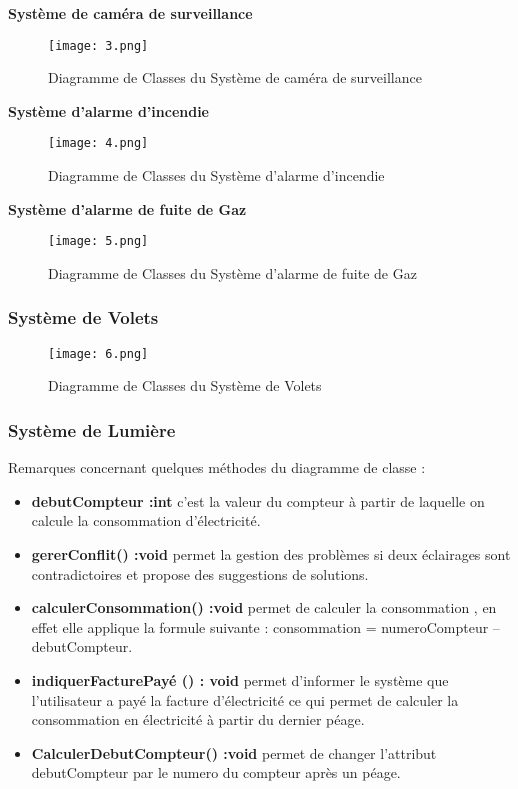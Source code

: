 \begin{spacing}{1.2}
\textbf{Système de caméra de surveillance}

\begin{figure}[H]\centering
\texttt{[image: 3.png]}
\caption{Diagramme de Classes du Système de caméra de surveillance}
\label{fig:fig3}
\end{figure}

\textbf{Système d’alarme d’incendie}

\begin{figure}[H]\centering
\texttt{[image: 4.png]}
\caption{Diagramme de Classes du Système d’alarme d’incendie}
\label{fig:fig3}
\end{figure}

\textbf{Système d’alarme de fuite de Gaz}

\begin{figure}[H]\centering
\texttt{[image: 5.png]}
\caption{Diagramme de Classes du Système d’alarme de fuite de Gaz}
\label{fig:fig3}
\end{figure}

\subsubsection{Système de Volets}
\begin{figure}[H]\centering
\texttt{[image: 6.png]}
\caption{Diagramme de Classes du Système de Volets}
\label{fig:fig3}
\end{figure}

\subsubsection{Système de Lumière}
Remarques concernant quelques méthodes du diagramme de classe :
\begin{itemize}
    \item \textbf{debutCompteur :int} c’est la valeur du compteur à partir de laquelle on calcule la consommation d’électricité. 
    \item \textbf{gererConflit() :void} permet la gestion des problèmes si deux éclairages sont contradictoires et propose des suggestions de solutions. 
    \item \textbf{calculerConsommation() :void} permet de calculer la consommation , en effet  elle applique la formule suivante : consommation = numeroCompteur – debutCompteur. \\
    \item \textbf{indiquerFacturePayé () : void} permet d’informer le système que l’utilisateur a payé la facture d’électricité ce qui permet de calculer la consommation en électricité à partir du dernier péage.
    \item \textbf{CalculerDebutCompteur() :void} permet de changer l’attribut debutCompteur par le numero du compteur après un péage.
\end{itemize}


\end{spacing}
